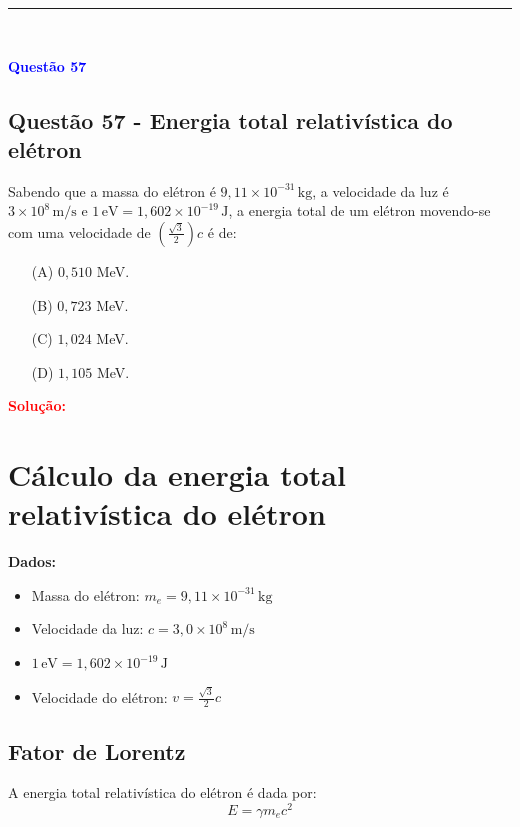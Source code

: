 \noindent\rule{\linewidth}{0.6pt}\\

\begin{flushleft}
\textbf{\textcolor{blue}{\Large Quest\~ao 57}}\\
\noindent
\subsection{Quest\~ao 57 - Energia total relativística do elétron}
Sabendo que a massa do elétron é \( 9,11 \times 10^{-31}\, \mathrm{kg} \), a velocidade da luz é 
\( 3 \times 10^8\, \mathrm{m/s} \) e \( 1\,\mathrm{eV} = 1{,}602 \times 10^{-19}\, \mathrm{J} \), 
a energia total de um elétron movendo-se com uma velocidade de \( \left( \frac{\sqrt{3}}{2} \right) c \) é de:

\begin{itemize}
\item[(A)] $0{,}510$ MeV.
\item[(B)] $0{,}723$ MeV.
\item[(C)] $1{,}024$ MeV.
\item[(D)] $1{,}105$ MeV.
\end{itemize}

\vspace{0.5cm}

\textcolor{red}{\textbf{Solução:}}\\

\section*{Cálculo da energia total relativística do elétron}

\textbf{Dados:}
\begin{itemize}
    \item Massa do elétron: \(m_e = 9{,}11 \times 10^{-31}\, \mathrm{kg}\)
    \item Velocidade da luz: \(c = 3{,}0 \times 10^8\, \mathrm{m/s}\)
    \item \(1\,\mathrm{eV} = 1{,}602 \times 10^{-19}\, \mathrm{J}\)
    \item Velocidade do elétron: \(v = \frac{\sqrt{3}}{2} c\)
\end{itemize}

\subsection*{Fator de Lorentz}

A energia total relativística do elétron é dada por:
\[
E = \gamma m_e c^2
\]


\end{flushleft}
